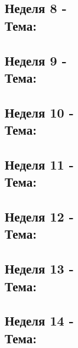 \documentclass[a4paper,11pt]{article}
\begin{document}
\subsection{Неделя 8 - \\ Тема: }

\subsection{Неделя 9 - \\ Тема: }

\subsection{Неделя 10 - \\ Тема: }

\subsection{Неделя 11 - \\ Тема: }

\subsection{Неделя 12 - \\ Тема: }

\subsection{Неделя 13 - \\ Тема: }

\subsection{Неделя 14 - \\ Тема: }
\end{document}
